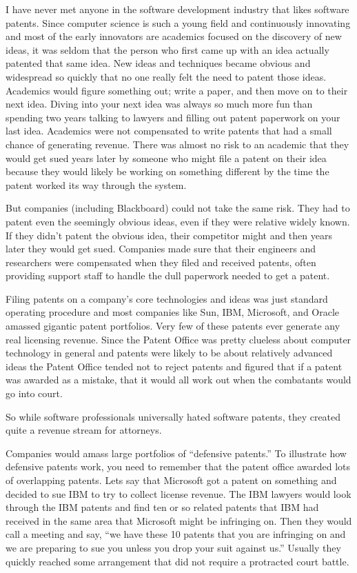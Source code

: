 \documentclass[12pt]{book}
\begin{document}
I have never met anyone in the software development industry that likes
software patents.  Since computer science is such a young field
and continuously innovating and most of the early innovators are academics
focused on the discovery of new ideas, it was seldom that the
person who first came up with an idea actually patented that same idea.
New ideas and techniques became obvious and widespread so quickly that
no one really felt the need to patent those ideas.
Academics would figure something out; write a paper, and then move on
to their next idea.   Diving into your next idea was always so much
more fun than spending two years talking to lawyers and filling out
patent paperwork on your last idea.  Academics were not compensated to
write patents that had a small chance of generating revenue.  There
was almost no risk to an academic that they would get sued years later
by someone who might file a patent on their idea because they would likely
be working on something different by the time the patent
worked its way through the system.

But companies (including Blackboard) could not take the same risk.
They had to patent even the seemingly obvious ideas, even if they were
relative widely known.  If they didn't patent the obvious idea,
their competitor might and then years later they would get sued.
Companies made sure that their engineers and researchers were
compensated when they filed and received patents, often providing
support staff to handle the dull paperwork needed to get a patent.

Filing patents on a company's core technologies and ideas was just
standard operating procedure and most companies like Sun,
IBM, Microsoft, and Oracle amassed gigantic patent portfolios.
Very few of these patents ever generate any real licensing revenue.
Since the Patent Office was pretty clueless about computer technology
in general and patents were likely to be about relatively advanced ideas
the Patent Office tended not to reject patents and figured that
if a patent was awarded as a mistake, that it would all work out
when the combatants would go into court.

So while software professionals universally hated software patents,
they created quite a revenue stream for attorneys.

Companies would amass large portfolios of ``defensive
patents.''  To illustrate how defensive patents work, you need to
remember that the patent office awarded lots of overlapping patents.
Lets say that Microsoft got a patent on something and decided to
sue IBM to try to collect license revenue.  The IBM lawyers would
look through the IBM patents and find ten or so related patents that
IBM had received in the same area that Microsoft might be infringing
on.  Then they would call a meeting and say, ``we have these 10
patents that you are infringing on and we are preparing to sue you
unless you drop your suit against us.''  Usually they quickly reached
some arrangement that did not require a protracted court battle.
\end{document}
